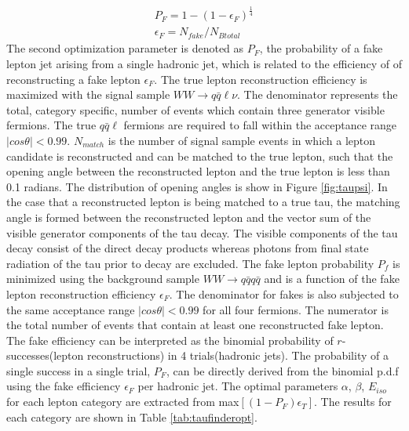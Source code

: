 \begin{equation}
\begin{split}
\label{eq:pf}
P_F = 1-(1-\epsilon_F)^{\frac{1}{4}} \\
\epsilon_F = N_{fake}/N_{Btotal}
\end{split}
\end{equation}
The second optimization parameter is denoted as $P_F$, the probability of a fake lepton jet arising from a single hadronic jet, which is related to the efficiency of of reconstructing a fake lepton $\epsilon_F$.
The true lepton reconstruction efficiency is maximized with the signal sample $WW\rightarrow q\bar{q}\ell\nu$. The denominator represents the total, category specific, number of events which contain three generator visible fermions. The true $q\bar{q}\ell$ fermions are required to fall within the acceptance range $|cos\theta| < 0.99$. $N_{match}$ is the number of signal sample events in which a lepton candidate is reconstructed and can be matched to the true lepton, such that the opening angle between the reconstructed lepton and the true lepton is less than 0.1 radians. The distribution of opening angles is show in Figure \ref{fig:taupsi}. In the case that a reconstructed lepton is being matched to a true tau, the matching angle is formed between the reconstructed lepton and the vector sum of the visible generator components of the tau decay. The visible components of the tau decay consist of the direct decay products whereas photons from final state radiation of the tau prior to decay are excluded. The fake lepton probability $P_f$ is minimized using the background sample $WW\rightarrow q\bar{q}q\bar{q}$ and is a function of the fake lepton reconstruction efficiency $\epsilon_F$. The denominator for fakes is also subjected to the same acceptance range $|cos\theta| < 0.99$ for all four fermions. The numerator is the total number of events  that contain at least one reconstructed fake lepton. The fake efficiency can be interpreted as the binomial probability of $r$-successes(lepton reconstructions) in 4 trials(hadronic jets). The probability of a single success in a single trial, $P_F$, can be directly derived from the binomial p.d.f using the fake efficiency $\epsilon_F$ per hadronic jet. The optimal parameters $\alpha$, $\beta$, $E_{iso}$ for each lepton category are extracted from max$[(1-P_F)\epsilon_T]$. The results for each category are shown in Table \ref{tab:taufinderopt}. 


